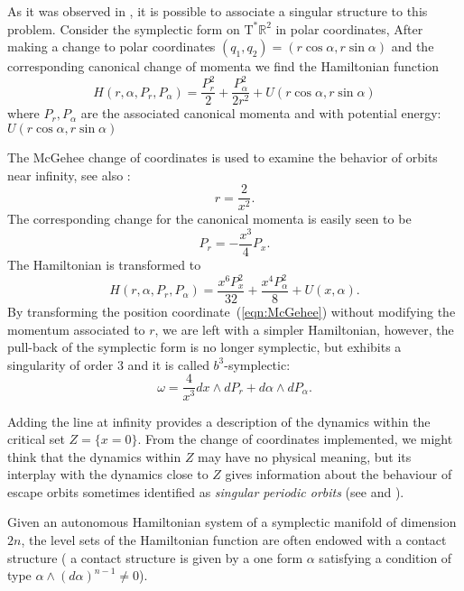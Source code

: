 As it was observed in \cite{kiesenhofermirandascott}, it is possible to associate a singular structure to this problem. Consider the symplectic form on $\mathrm{T}^{\ast} \mathbb{R}^2$ in polar coordinates,
After making a change to polar coordinates $(q_1,q_2)=(r\cos\alpha,r\sin\alpha)$ and the corresponding canonical change of momenta we find the Hamiltonian function
\begin{equation}
H(r,\alpha,P_r,P_\alpha)=\frac{P_r^2}{2}+\frac{P_\alpha ^2}{2r^2}+U(r\cos\alpha,r\sin\alpha)
\end{equation}
where $P_r,P_\alpha$ are the associated canonical momenta and with potential energy:
$U(r\cos\alpha,r\sin\alpha)$

The McGehee change of coordinates is used to examine the behavior of orbits near infinity, see also \cite{delshams2015global}:
\begin{equation}\label{eqn:McGehee}
r=\frac{2}{x^2}.
\end{equation}
The corresponding change for the canonical momenta is easily seen to be
\begin{equation}
P_r=-\frac{x^3}{4}P_x.
\end{equation}
The Hamiltonian is transformed to
\begin{equation}
H(r,\alpha,P_r,P_\alpha)=\frac{x^6P_x^2}{32}+\frac{x^4P_\alpha^2}{8}+U(x,\alpha).
\end{equation}
By  transforming the position coordinate~(\ref{eqn:McGehee}) without modifying the momentum associated to $r$, we are left with a simpler Hamiltonian, however, the pull-back of the symplectic form  is no longer symplectic, but exhibits a singularity of order $3$ and it is called $b^3$-symplectic:
\begin{equation}
\omega= \frac{4}{x^3} dx \wedge dP_r + d\alpha\wedge d P_\alpha.
\end{equation}

Adding the line at infinity provides a description of the dynamics within the critical set $Z=\{x=0\}$.
From the change of coordinates implemented, we might think that the dynamics within  $Z$ may have  no physical meaning, but its interplay with the dynamics close to $Z$ gives information about the behaviour of escape orbits sometimes identified as \emph{singular periodic orbits} (see \cite{MO20} and \cite{cedricdanieleva}).




Given an autonomous Hamiltonian system of a symplectic manifold  of dimension $2n$, the level sets of the Hamiltonian function are often endowed with a contact structure
( a contact structure is given by a one form $\alpha$ satisfying a condition of type $\alpha\wedge (d\alpha)^{n-1}\neq 0$).

